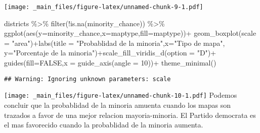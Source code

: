 \documentclass[
]{book}
\newenvironment{Shaded}{\begin{snugshade}}{\end{snugshade}}
\newcommand{\AttributeTok}[1]{\textcolor[rgb]{0.77,0.63,0.00}{#1}}
\newcommand{\ConstantTok}[1]{\textcolor[rgb]{0.00,0.00,0.00}{#1}}
\newcommand{\DecValTok}[1]{\textcolor[rgb]{0.00,0.00,0.81}{#1}}
\newcommand{\FunctionTok}[1]{\textcolor[rgb]{0.00,0.00,0.00}{#1}}
\newcommand{\NormalTok}[1]{#1}
\newcommand{\SpecialCharTok}[1]{\textcolor[rgb]{0.00,0.00,0.00}{#1}}
\newcommand{\StringTok}[1]{\textcolor[rgb]{0.31,0.60,0.02}{#1}}
\begin{document}
\texttt{[image: \_main\_files/figure-latex/unnamed-chunk-9-1.pdf]}

\begin{Shaded}
\begin{Highlighting}[]
\NormalTok{districts }\SpecialCharTok{\%\textgreater{}\%}
  \FunctionTok{filter}\NormalTok{(}\SpecialCharTok{!}\FunctionTok{is.na}\NormalTok{(minority\_chance)) }\SpecialCharTok{\%\textgreater{}\%} 
\FunctionTok{ggplot}\NormalTok{(}\FunctionTok{aes}\NormalTok{(}\AttributeTok{y=}\NormalTok{minority\_chance,}\AttributeTok{x=}\NormalTok{maptype,}\AttributeTok{fill=}\NormalTok{maptype))}\SpecialCharTok{+}
  \FunctionTok{geom\_boxplot}\NormalTok{(}\AttributeTok{scale =} \StringTok{"area"}\NormalTok{)}\SpecialCharTok{+}\FunctionTok{labs}\NormalTok{(}\AttributeTok{title =} \StringTok{"Probablidad de la minoria"}\NormalTok{,}\AttributeTok{x=}\StringTok{"Tipo de mapa"}\NormalTok{, }\AttributeTok{y=}\StringTok{"Porcentaje de la minoria"}\NormalTok{)}\SpecialCharTok{+}\FunctionTok{scale\_fill\_viridis\_d}\NormalTok{(}\AttributeTok{option =} \StringTok{"D"}\NormalTok{)}\SpecialCharTok{+}
  \FunctionTok{guides}\NormalTok{(}\AttributeTok{fill=}\ConstantTok{FALSE}\NormalTok{,}\AttributeTok{x =}  \FunctionTok{guide\_axis}\NormalTok{(}\AttributeTok{angle =} \DecValTok{10}\NormalTok{))}\SpecialCharTok{+}
  \FunctionTok{theme\_minimal}\NormalTok{()}
\end{Highlighting}
\end{Shaded}

\begin{verbatim}
## Warning: Ignoring unknown parameters: scale
\end{verbatim}

\texttt{[image: \_main\_files/figure-latex/unnamed-chunk-10-1.pdf]}
Podemos concluir que la probablidad de la minoria amuenta cuando los mapas son trazados a favor de una mejor relacion mayoria-minoria. El Partido democrata es el mas favorecido cuando la probablidad de la minoria aumenta.
\end{document}

